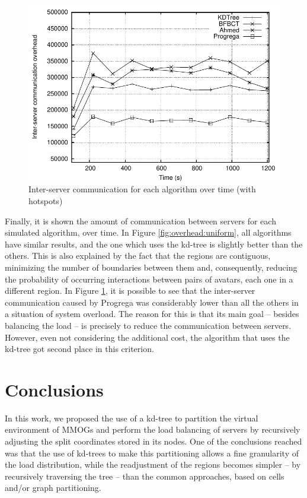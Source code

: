 \documentclass[acmtocl]{acmtrans2m}
\begin{document}
\begin{figure}[!t]
	\centering
	\includegraphics[width=\linewidth]{images/overhead_hotspots}
	\caption{Inter-server communication for each algorithm over time (with hotspots)}
	\label{fig:overhead:hotspots}
\end{figure}

Finally, it is shown the amount of communication between servers for each simulated algorithm, over time. In Figure \ref{fig:overhead:uniform}, all algorithms have similar results, and the one which uses the kd-tree is slightly better than the others. This is also explained by the fact that the regions are contiguous, minimizing the number of boundaries between them and, consequently, reducing the probability of occurring interactions between pairs of avatars, each one in a different region. In Figure \ref{fig:overhead:hotspots}, it is possible to see that the inter-server communication caused by Progrega was considerably lower than all the others in a situation of system overload. The reason for this is that its main goal -- besides balancing the load -- is precisely to reduce the communication between servers. However, even not considering the additional cost, the algorithm that uses the kd-tree got second place in this criterion.

\section{Conclusions}
\label{sec:conc}

In this work, we proposed the use of a kd-tree to partition the virtual environment of MMOGs and perform the load balancing of servers by recursively adjusting the split coordinates stored in its nodes. One of the conclusions reached was that the use of kd-trees to make this partitioning allows a fine granularity of the load distribution, while the readjustment of the regions becomes simpler -- by recursively traversing the tree -- than the common approaches, based on cells and/or graph partitioning.
\end{document}
